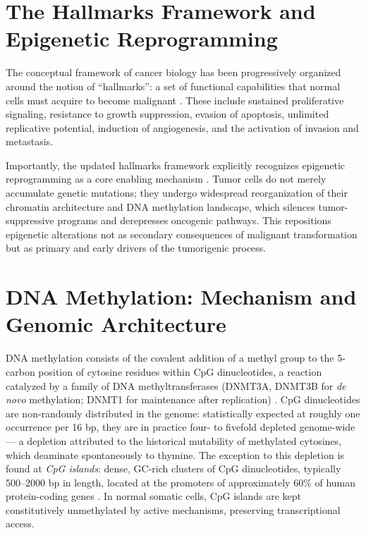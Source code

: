 \section{The Hallmarks Framework and Epigenetic Reprogramming}

The conceptual framework of cancer biology has been progressively organized
around the notion of ``hallmarks'': a set of functional capabilities that normal
cells must acquire to become malignant \cite{Hanahan2000,Hanahan2011}. These
include sustained proliferative signaling, resistance to growth suppression, evasion
of apoptosis, unlimited replicative potential, induction of angiogenesis, and the
activation of invasion and metastasis.

Importantly, the updated hallmarks framework explicitly recognizes epigenetic
reprogramming as a core enabling mechanism \cite{Hanahan2011}. Tumor cells do not
merely accumulate genetic mutations; they undergo widespread reorganization of
their chromatin architecture and DNA methylation landscape, which silences
tumor-suppressive programs and derepresses oncogenic pathways. This repositions
epigenetic alterations not as secondary consequences of malignant transformation
but as primary and early drivers of the tumorigenic process.

\section{DNA Methylation: Mechanism and Genomic Architecture}
\label{sec:methylation_mechanism}

DNA methylation consists of the covalent addition of a methyl group to the
5-carbon position of cytosine residues within CpG dinucleotides, a reaction
catalyzed by a family of DNA methyltransferases (DNMT3A, DNMT3B for \textit{de novo}
methylation; DNMT1 for maintenance after replication) \cite{bird2002}.
CpG dinucleotides are non-randomly distributed in the genome: statistically
expected at roughly one occurrence per 16 bp, they are in practice four- to
fivefold depleted genome-wide — a depletion attributed to the historical
mutability of methylated cytosines, which deaminate spontaneously to thymine.
The exception to this depletion is found at \textit{CpG islands}: dense,
GC-rich clusters of CpG dinucleotides, typically 500–2000 bp in length,
located at the promoters of approximately 60\% of human protein-coding genes
\cite{bird2002}. In normal somatic cells, CpG islands are kept constitutively
unmethylated by active mechanisms, preserving transcriptional access.

